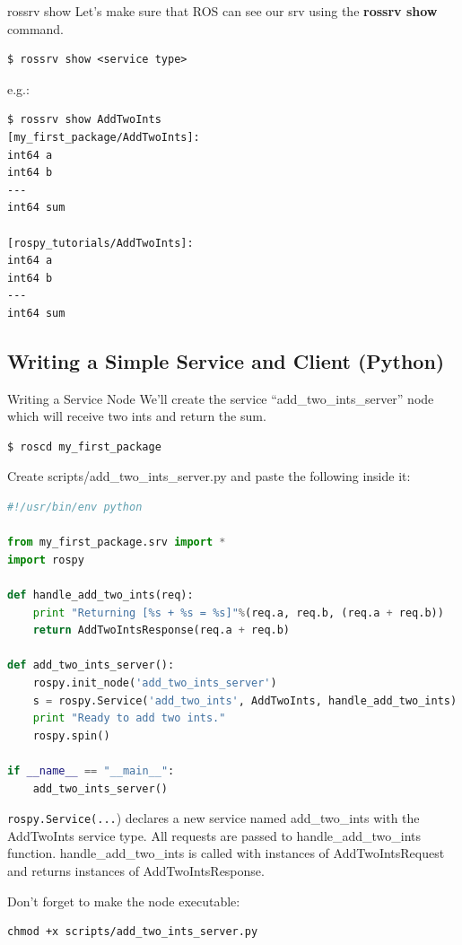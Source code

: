 \begin{frame}[fragile]{rossrv show}
Let's make sure that ROS can see our srv using the \textbf{rossrv show} command.

\begin{lstlisting}[language=syntax]
$ rossrv show <service type>
\end{lstlisting}

e.g.:
\begin{lstlisting}[language=shell]
$ rossrv show AddTwoInts
[my_first_package/AddTwoInts]:
int64 a
int64 b
---
int64 sum

[rospy_tutorials/AddTwoInts]:
int64 a
int64 b
---
int64 sum
\end{lstlisting}
\end{frame}

\subsection{Writing a Simple Service and Client (Python)}

\begin{frame}{Writing a Service Node}
We'll create the service ``add\_two\_ints\_server'' node which will receive two ints and return the sum.

\begin{lstlisting}[language=shell]
$ roscd my_first_package
\end{lstlisting}

Create scripts/add\_two\_ints\_server.py and paste the following inside it:

\begin{lstlisting}[language=python]
#!/usr/bin/env python

from my_first_package.srv import *
import rospy

def handle_add_two_ints(req):
    print "Returning [%s + %s = %s]"%(req.a, req.b, (req.a + req.b))
    return AddTwoIntsResponse(req.a + req.b)

def add_two_ints_server():
    rospy.init_node('add_two_ints_server')
    s = rospy.Service('add_two_ints', AddTwoInts, handle_add_two_ints)
    print "Ready to add two ints."
    rospy.spin()

if __name__ == "__main__":
    add_two_ints_server()
\end{lstlisting}

\texttt{rospy.Service(...}) declares a new service named add\_two\_ints with the AddTwoInts service type. All requests are passed to handle\_add\_two\_ints function. handle\_add\_two\_ints is called with instances of AddTwoIntsRequest and returns instances of AddTwoIntsResponse.

\vspace{.1cm}
Don't forget to make the node executable:
\begin{lstlisting}[language=shell]
chmod +x scripts/add_two_ints_server.py
\end{lstlisting}
\end{frame}

